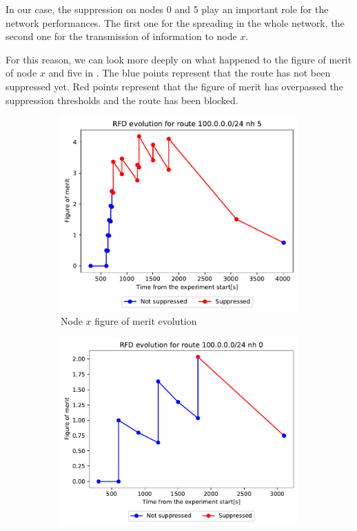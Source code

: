 In our case, the suppression on nodes \num{0} and \num{5} play an important role
for the network performances.
The first one for the spreading in the whole network, the second one for the
transmission of information to node $x$.

For this reason, we can look more deeply on what happened to the figure of merit
of node $x$ and five in .
The blue points represent that the route has not been suppressed yet.
Red points represent that the figure of merit has overpassed the suppression
thresholds and the route has been blocked.

\begin{figure}[h]
     \centering
     \begin{subfigure}[b]{0.476\textwidth}
         \centering
         \includegraphics[width=\textwidth]{images/RFD/clique/FigureOfMerit/mrai7_RFD_x_rfd_R1.pdf}
         \caption{Node $x$ figure of merit evolution}
         \label{fig:clique_nodex_30}
     \end{subfigure}
     \hfill
     \begin{subfigure}[b]{0.494\textwidth}
         \centering
         \includegraphics[width=\textwidth]{images/RFD/clique/FigureOfMerit/mrai7_RFD_5_rfd_R4.pdf}

\end{subfigure}
\end{figure}
